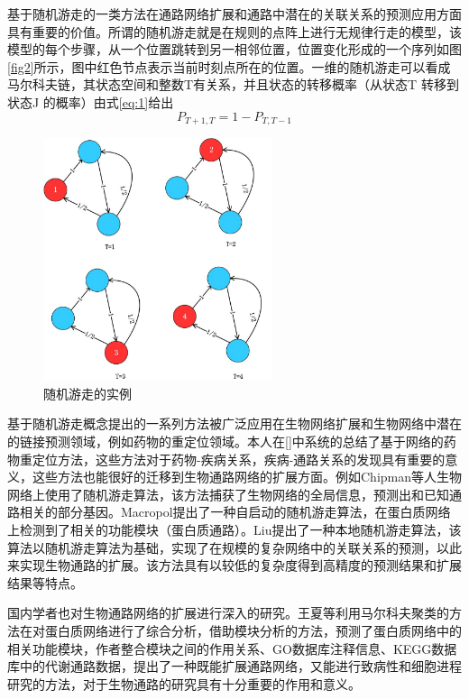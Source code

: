 基于随机游走的一类方法在通路网络扩展和通路中潜在的关联关系的预测应用方面具有重要的价值。所谓的随机游走就是在规则的点阵上进行无规律行走的模型，该模型的每个步骤，从一个位置跳转到另一相邻位置，位置变化形成的一个序列如图\ref{fig2}所示，图中红色节点表示当前时刻点所在的位置。一维的随机游走可以看成马尔科夫链，其状态空间和整数T有关系，并且状态的转移概率（从状态T 转移到状态J 的概率）由式\ref{eq:1}给出
\begin{equation}\label{eq:1}
	P_{T+1,T} = 1-P_{T,T-1}
\end{equation}

\begin{figure}
\centering
\includegraphics[width = 0.6\textwidth]{rw}
\caption[fig2]{随机游走的实例}
\end{figure}
基于随机游走概念提出的一系列方法被广泛应用在生物网络扩展和生物网络中潜在的链接预测领域，例如药物的重定位领域。本人在[]中系统的总结了基于网络的药物重定位方法，这些方法对于药物-疾病关系，疾病-通路关系的发现具有重要的意义，这些方法也能很好的迁移到生物通路网络的扩展方面。例如Chipman\cite{chipman2009predicting}等人生物网络上使用了随机游走算法，该方法捕获了生物网络的全局信息，预测出和已知通路相关的部分基因。Macropol\cite{Macropol}提出了一种自启动的随机游走算法，在蛋白质网络上检测到了相关的功能模块（蛋白质通路）。Liu\cite{liu2010link}提出了一种本地随机游走算法，该算法以随机游走算法为基础，实现了在规模的复杂网络中的关联关系的预测，以此来实现生物通路的扩展。该方法具有以较低的复杂度得到高精度的预测结果和扩展结果等特点。


国内学者也对生物通路网络的扩展进行深入的研究。王夏\cite{王夏2009大肠杆菌}等利用马尔科夫聚类的方法在对蛋白质网络进行了综合分析，借助模块分析的方法，预测了蛋白质网络中的相关功能模块，作者整合模块之间的作用关系、GO数据库注释信息、KEGG\cite{kanehisa2008kegg}数据库中的代谢通路数据，提出了一种既能扩展通路网络，又能进行致病性和细胞进程研究的方法，对于生物通路的研究具有十分重要的作用和意义。

